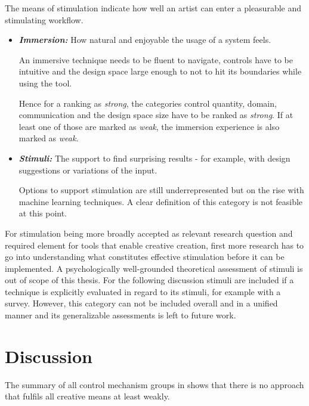 The means of stimulation indicate how well an artist can enter a pleasurable and stimulating workflow.
\begin{itemize}
    \item \textit{\textbf{Immersion:}} How natural and enjoyable the usage of a system feels.

    An immersive technique needs to be fluent to navigate, controls have to be intuitive and the design space large enough to not to hit its boundaries while using the tool. 
    
    Hence for a ranking as \textit{strong}, the categories control quantity, domain, communication and the design space size have to be ranked as \textit{strong}. If at least one of those are marked as \textit{weak}, the immersion experience is also marked as \textit{weak}.

    \item \textit{\textbf{Stimuli:}} The support to find surprising results - for example, with design suggestions or variations of the input. 

    Options to support stimulation are still underrepresented but on the rise with machine learning techniques. A clear definition of this category is not feasible at this point.

\end{itemize}

For stimulation being more broadly accepted as relevant research question and required element for tools that enable creative creation, first more research has to go into understanding what constitutes effective stimulation before it can be implemented. A psychologically well-grounded theoretical assessment of stimuli is out of scope of this thesis. For the following discussion stimuli are included if a technique is explicitly evaluated in regard to its stimuli, for example with a survey. However, this category can not be included overall and in a unified manner and its generalizable assessments is left to future work.

\section{Discussion}
\label{subsec:creativity_discussion}



The summary of all control mechanism groups in  shows that there is no approach that fulfils all creative means at least weakly. 

